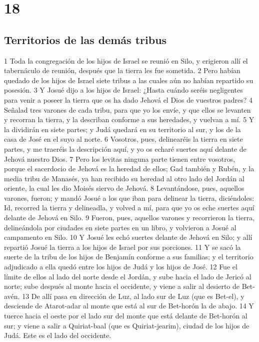 \chapter{18}

\section*{Territorios de las demás tribus}

1 Toda la congregación de los hijos de Israel se reunió en Silo, y erigieron allí el tabernáculo de reunión, después que la tierra les fue sometida.
2 Pero habían quedado de los hijos de Israel siete tribus a las cuales aún no habían repartido su posesión.
3 Y Josué dijo a los hijos de Israel: ¿Hasta cuándo seréis negligentes para venir a poseer la tierra que os ha dado Jehová el Dios de vuestros padres?
4 Señalad tres varones de cada tribu, para que yo los envíe, y que ellos se levanten y recorran la tierra, y la describan conforme a sus heredades, y vuelvan a mí.
5 Y la dividirán en siete partes; y Judá quedará en su territorio al sur, y los de la casa de José en el suyo al norte.
6 Vosotros, pues, delinearéis la tierra en siete partes, y me traeréis la descripción aquí, y yo os echaré suertes aquí delante de Jehová nuestro Dios.
7 Pero los levitas ninguna parte tienen entre vosotros, porque el sacerdocio de Jehová es la heredad de ellos; Gad también y Rubén, y la media tribu de Manasés, ya han recibido su heredad al otro lado del Jordán al oriente, la cual les dio Moisés siervo de Jehová.
8 Levantándose, pues, aquellos varones, fueron; y mandó Josué a los que iban para delinear la tierra, diciéndoles: Id, recorred la tierra y delineadla, y volved a mí, para que yo os eche suertes aquí delante de Jehová en Silo.
9 Fueron, pues, aquellos varones y recorrieron la tierra, delineándola por ciudades en siete partes en un libro, y volvieron a Josué al campamento en Silo.
10 Y Josué les echó suertes delante de Jehová en Silo; y allí repartió Josué la tierra a los hijos de Israel por sus porciones.
11 Y se sacó la suerte de la tribu de los hijos de Benjamín conforme a sus familias; y el territorio adjudicado a ella quedó entre los hijos de Judá y los hijos de José.
12 Fue el límite de ellos al lado del norte desde el Jordán, y sube hacia el lado de Jericó al norte; sube después al monte hacia el occidente, y viene a salir al desierto de Bet-avén.
13 De allí pasa en dirección de Luz, al lado sur de Luz (que es Bet-el), y desciende de Atarot-adar al monte que está al sur de Bet-horón la de abajo.
14 Y tuerce hacia el oeste por el lado sur del monte que está delante de Bet-horón al sur; y viene a salir a Quiriat-baal (que es Quiriat-jearim), ciudad de los hijos de Judá. Este es el lado del occidente.
